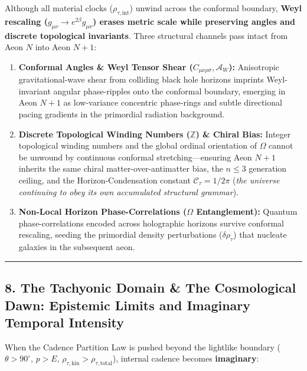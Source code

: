 \documentclass[
]{article}
\providecommand{\tightlist}{%
  \setlength{\itemsep}{0pt}\setlength{\parskip}{0pt}}
\begin{document}
Although all material clocks (\(\rho_{\tau,\text{int}}\)) unwind across
the conformal boundary, \textbf{Weyl rescaling
(\(g_{\mu\nu} \to e^{2\beta} g_{\mu\nu}\)) erases metric scale while
preserving angles and discrete topological invariants}. Three structural
channels pass intact from Aeon \(N\) into Aeon \(N + 1\):

\begin{enumerate}
\def\labelenumi{\arabic{enumi}.}
\tightlist
\item
  \textbf{Conformal Angles \& Weyl Tensor Shear
  (\(C_{\mu\nu\rho\sigma}, \mathcal{A}_W\)):} Anisotropic
  gravitational-wave shear from colliding black hole horizons imprints
  Weyl-invariant angular phase-ripples onto the conformal boundary,
  emerging in Aeon \(N + 1\) as low-variance concentric phase-rings and
  subtle directional pacing gradients in the primordial radiation
  background.
\item
  \textbf{Discrete Topological Winding Numbers (\(\mathbb{Z}\)) \&
  Chiral Bias:} Integer topological winding numbers and the global
  ordinal orientation of \(\Omega\) cannot be unwound by continuous
  conformal stretching---ensuring Aeon \(N + 1\) inherits the same
  chiral matter-over-antimatter bias, the \(n \le 3\) generation
  ceiling, and the Horizon-Condensation constant
  \(\mathcal{C}_\tau = 1/2\pi\) (\emph{the universe continuing to obey
  its own accumulated structural grammar}).
\item
  \textbf{Non-Local Horizon Phase-Correlations (\(\Omega\)
  Entanglement):} Quantum phase-correlations encoded across holographic
  horizons survive conformal rescaling, seeding the primordial density
  perturbations (\(\delta\rho_\tau\)) that nucleate galaxies in the
  subsequent aeon.
\end{enumerate}

\begin{center}\rule{0.5\linewidth}{0.5pt}\end{center}

\subsection{8. The Tachyonic Domain \& The Cosmological Dawn: Epistemic
Limits and Imaginary Temporal
Intensity}\label{the-tachyonic-domain-the-cosmological-dawn-epistemic-limits-and-imaginary-temporal-intensity}

When the Cadence Partition Law is pushed beyond the lightlike boundary
(\(\theta > 90^\circ\), \(p > E\),
\(\rho_{\tau,\text{kin}} > \rho_{\tau,\text{total}}\)), internal cadence
becomes \textbf{imaginary}:
\end{document}
